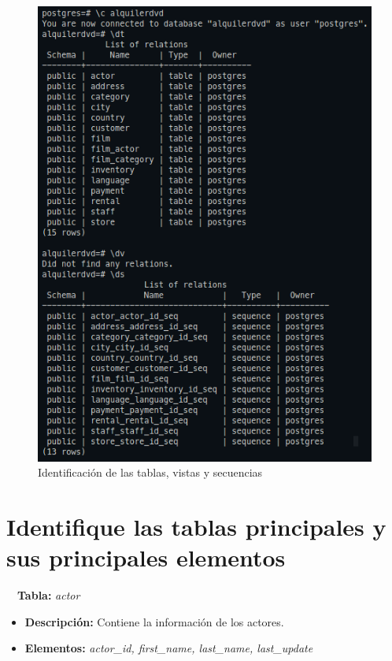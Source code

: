 \documentclass{report}
\begin{document}
\begin{figure}[H]
  \centering
  \includegraphics[scale=0.48]{img/tablas_vistas_secuencias.png}
  \caption{Identificación de las tablas, vistas y secuencias}
  \label{fig:identificación de las tablas, vistas y secuencias}
\end{figure}

\chapter{Identifique las tablas principales y sus principales elementos}

\CIRCLE \ \ \textbf{Tabla:} \emph{actor}
\begin{itemize}
  \item \textbf{Descripción:} Contiene la información de los actores.
  \item \textbf{Elementos:} \emph{actor\_id, first\_name, last\_name, last\_update}
\end{itemize}
\end{document}
